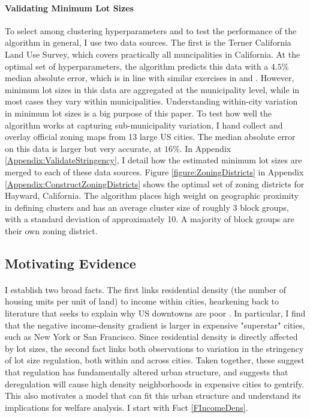 \documentclass[12pt]{article}
\begin{document}
	 \paragraph{Validating Minimum Lot Sizes} To select among clustering hyperparameters and to test the performance of the algorithm in general, I use two data sources. The first is the Terner California Land Use Survey, which covers practically all muncipalities in California. At the optimal set of hyperparameters, the algorithm predicts this data with a $4.5 \%$ median absolute error, which is in line with similar exercises in \cite{Song} and \cite{Cui}. However, minimum lot sizes in this data are aggregated at the municipality level, while in most cases they vary within municipalities. Understanding within-city variation in minimum lot sizes is a big purpose of this paper. To test how well the algorithm works at capturing sub-municipality variation, I hand collect and overlay official zoning maps from 13 large US cities. The median absolute error on this data is larger but very accurate, at $16 \%$. In Appendix \ref{Appendix:ValidateStringency}, I detail how the estimated minimum lot sizes are merged to each of these data sources. Figure \ref{figure:ZoningDistricts} in Appendix \ref{Appendix:ConstructZoningDistricts} shows the optimal set of zoning districts for Hayward, California. The algorithm places high weight on geographic proximity in defining clusters and has an average cluster size of roughly 3 block groups, with a standard deviation of approximately 10. A majority of block groups are their own zoning district.
	 
	 
	 \subsection{Motivating Evidence}
	 
	 \paragraph*{}
	 I establish two broad facts. The first links residential density (the number of housing units per unit of land) to income within cities, hearkening back to literature that seeks to explain why US downtowns are poor \citep{Gentrificationcycles, ccpoortransport, parispoor}. In particular, I find that the negative income-density gradient is larger in expensive "superstar" cities, such as New York or San Francisco. Since residential density is directly affected by lot sizes, the second fact links both observations to variation in the stringency of lot size regulation, both within and across cities. Taken together, these suggest that regulation has fundamentally altered urban structure, and suggests that deregulation will cause high density neighborhoods in expensive cities to gentrify. This also motivates a model that can fit this urban structure and understand its implications for welfare analysis. I start with Fact \ref{FIncomeDens}. 
\end{document}
